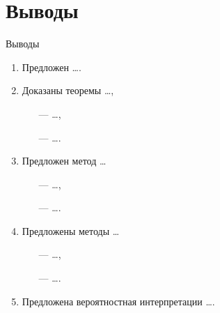 \documentclass[10pt,pdf,hyperref={unicode}]{beamer}
\begin{document}
\section{Выводы}
\begin{frame}{Выводы}
\justifying
	\begin{enumerate}
	\justifying
	    \item Предложен \ldots.
        \item Доказаны теоремы \ldots, 
        \begin{itemize}
            \item[---] \ldots,
            \item[---] \ldots.
        \end{itemize}
        \item Предложен метод \ldots
        \begin{itemize}
            \item[---] \ldots,
            \item[---] \ldots.
        \end{itemize}
        \item Предложены методы \ldots
        \begin{itemize}
            \item[---] \ldots,
            \item[---] \ldots.
        \end{itemize}
        \item Предложена вероятностная интерпретации \ldots.
	\end{enumerate}
\end{frame}
\end{document}
